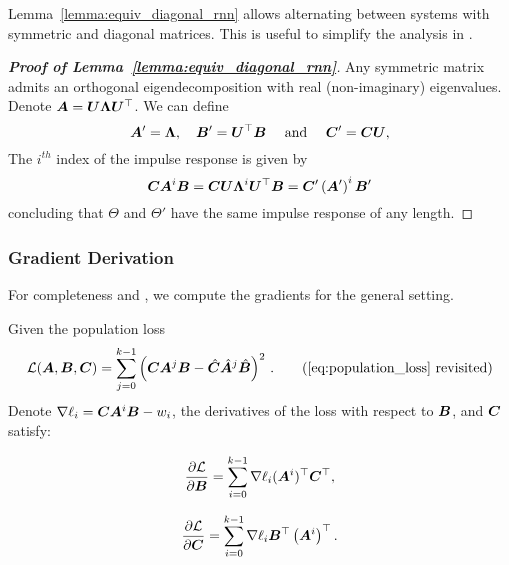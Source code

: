 Lemma~\ref{lemma:equiv_diagonal_rnn} allows alternating between systems with symmetric and diagonal matrices. This is useful to simplify the analysis in .

\begin{proof}[\textbf{Proof of Lemma~\ref{lemma:equiv_diagonal_rnn}}]
    Any symmetric matrix admits an orthogonal eigendecomposition with real (non-imaginary) eigenvalues. Denote ${\bm{A}}={\bm{U}}{\bm{\Lambda}}{\bm{U}}^\top$. We can define
\begin{equation*}
    {\bm{A}}'={\bm{\Lambda}},
    \quad
    {\bm{B}}'={\bm{U}}^\top {\bm{B}}
    \quad
    \text{ and }
    \quad
    {\bm{C}}'={\bm{C}}{\bm{U}},
\end{equation*}
The $i^{th}$ index of the impulse response is given by  
\begin{equation*}
    {\bm{C}}{\bm{A}}^i{\bm{B}}={\bm{C}}{\bm{U}}{\bm{\Lambda}}^i{\bm{U}}^\top{\bm{B}}={\bm{C}}'\left({\bm{A}}'\right)^i{\bm{B}}'
\end{equation*}
concluding that $\Theta$ and $\Theta'$ have the same impulse response of any length.
\end{proof}

\subsubsection{Gradient Derivation}\label{sec:grad_derivation}
For completeness and , we compute the gradients for the general setting.
\begin{lemma} \label{lemma:gradients}
Given the population loss
\begin{equation}
\mathcal{L}(\mA,\mB,\mC)=\sum_{j=0}^{k-1} \left(\mC\mA^j \mB-\hat{\mC}\hat{\mA}^j\hat{\mB}\right)^2
    \text{\,.}\tag{\ref{eq:population_loss} revisited}
\end{equation}
Denote $\nabla \ell_i = {\bm{C}}{\bm{A}}^i{\bm{B}}-w_i$, the derivatives of the loss with respect to ${\bm{B}}$, and ${\bm{C}}$ satisfy:


\begin{equation}
    \frac{\partial \mathcal{L}}{\partial {\bm{B}}} = \sum_{i=0}^{k-1} \nabla \ell_i ({\bm{A}}^i)^\top {\bm{C}}^\top,
\end{equation}

\begin{equation}
    \frac{\partial \mathcal{L}}{\partial {\bm{C}}} = \sum_{i=0}^{k-1} \nabla \ell_i {\bm{B}}^\top \left({\bm{A}}^i\right)^\top.
\end{equation}


\end{lemma}

